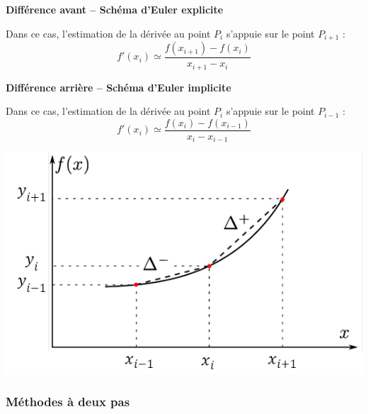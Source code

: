 \documentclass[10pt,fleqn]{article} %
\begin{document}
\begin{minipage}[c]{.49\linewidth}
\begin{resultat}
\textbf{Différence avant -- Schéma d'Euler explicite}

Dans ce cas, l'estimation de la dérivée au point $P_i$ s'appuie sur le point $P_{i+1}$ :
$$
f'(x_i)\simeq\dfrac{f(x_{i+1})-f(x_i)}{x_{i+1}-x_i}
$$
\end{resultat}

\begin{resultat}
\textbf{Différence arrière -- Schéma d'Euler implicite}

Dans ce cas, l'estimation de la dérivée au point $P_i$ s'appuie sur le point $P_{i-1}$ :
$$
f'(x_i)\simeq\dfrac{f(x_{i})-f(x_{i-1})}{x_{i}-x_{i-1}}
$$
\end{resultat}
\end{minipage}\hfill
\begin{minipage}[c]{.49\linewidth}
\begin{center}
\includegraphics[width=\textwidth]{images/derivation_1pas}
\end{center}
\end{minipage}

\subsubsection{Méthodes à deux pas}
\end{document}

